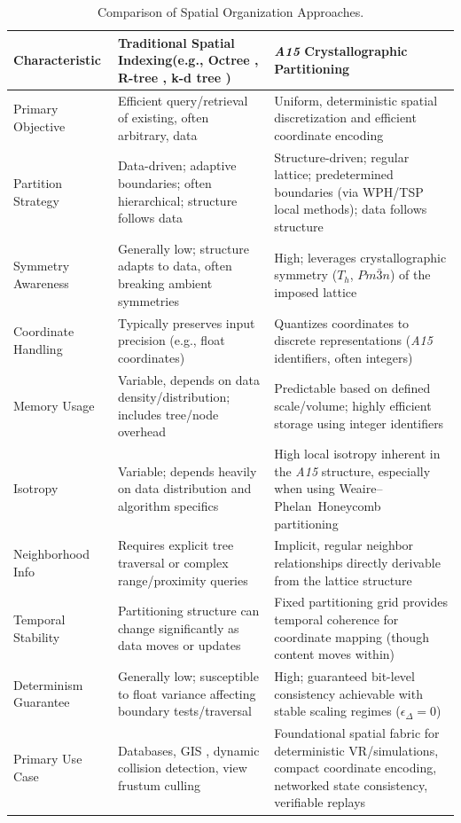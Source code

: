 \documentclass[10pt]{article}
\def\AAAB{\textit{A15}}
\def\WP{Weaire--Phelan}
\def\WPH{\WP{}~Honeycomb}
\begin{document}
\begin{table}[!ht]
\centering
\caption{Comparison of Spatial Organization Approaches.}
\label{tab-comparison-indexing}
\begin{tabularx}{\textwidth}{>{\raggedright\arraybackslash}p{} >{\raggedright\arraybackslash}p{} >{\raggedright\arraybackslash}X}
\toprule
\textbf{Characteristic} & \textbf{Traditional Spatial Indexing}\newline (e.g., Octree \cite{Finkel1974}, R-tree \cite{Guttman1984}, k-d tree \cite{Bentley1975}) & \textbf{\AAAB{} Crystallographic Partitioning} \\
\midrule
Primary Objective & Efficient query/retrieval of existing, often arbitrary, data & Uniform, deterministic spatial discretization and efficient coordinate encoding \\ \addlinespace
Partition Strategy & Data-driven; adaptive boundaries; often hierarchical; structure follows data & Structure-driven; regular lattice; predetermined boundaries (via WPH/TSP local methods); data follows structure \\ \addlinespace
Symmetry Awareness & Generally low; structure adapts to data, often breaking ambient symmetries & High; leverages crystallographic symmetry ($T_h$, $Pm\bar{3}n$) of the imposed lattice \\ \addlinespace
Coordinate Handling & Typically preserves input precision (e.g., float coordinates) & Quantizes coordinates to discrete representations (\AAAB{} identifiers, often integers) \\ \addlinespace
Memory Usage & Variable, depends on data density/distribution; includes tree/node overhead & Predictable based on defined scale/volume; highly efficient storage using integer identifiers \\ \addlinespace
Isotropy & Variable; depends heavily on data distribution and algorithm specifics & High local isotropy inherent in the \AAAB{} structure, especially when using \WPH{} partitioning \\ \addlinespace
Neighborhood Info & Requires explicit tree traversal or complex range/proximity queries & Implicit, regular neighbor relationships directly derivable from the lattice structure \\ \addlinespace
Temporal Stability & Partitioning structure can change significantly as data moves or updates & Fixed partitioning grid provides temporal coherence for coordinate mapping (though content moves within) \\ \addlinespace
Determinism Guarantee & Generally low; susceptible to float variance affecting boundary tests/traversal & High; guaranteed bit-level consistency achievable with stable scaling regimes ($\epsilon_\Delta = 0$) \\ \addlinespace
Primary Use Case & Databases, GIS \cite{Samet1990}, dynamic collision detection, view frustum culling & Foundational spatial fabric for deterministic VR/simulations, compact coordinate encoding, networked state consistency, verifiable replays \\
\bottomrule
\end{tabularx}
\end{table}
\end{document}
